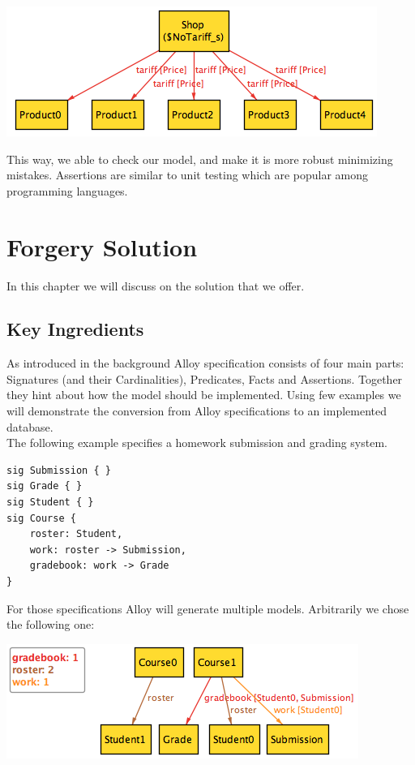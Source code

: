 \documentclass[oneside]{book}
\begin{document}
\begin{center}
\includegraphics[scale=0.6]{counterexample1}
\end{center}

This way, we able to check our model, and make it is more robust minimizing mistakes. Assertions are similar to unit testing which are popular among programming languages.

\newpage

\chapter{Forgery Solution}
In this chapter we will discuss on the solution that we offer.

\section{Key Ingredients}

As introduced in the background Alloy specification consists of four main parts: Signatures (and their Cardinalities), Predicates, Facts and Assertions. Together they hint about how the model should be implemented. Using few examples we will demonstrate the conversion from Alloy specifications to an implemented database.\\

The following example specifies a homework submission and grading system. 

\begin{lstlisting}
sig Submission { } 
sig Grade { }
sig Student { }
sig Course {
	roster: Student,
	work: roster -> Submission,
	gradebook: work -> Grade
}
\end{lstlisting}

For those specifications Alloy will generate multiple models. Arbitrarily we chose the following one:\\

\begin{center}
\includegraphics[scale=0.6]{overview1}
\end{center}
\end{document}
